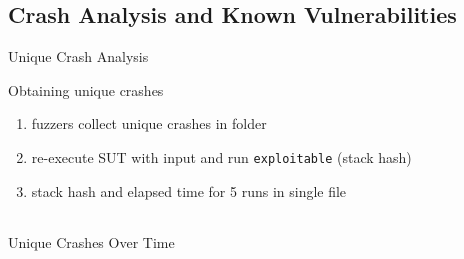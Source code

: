 \documentclass[\HandoutMode,table]{beamer}
\newcommand\figwidth\textwidth
\begin{document}
\subsection{Crash Analysis and Known Vulnerabilities}

\begin{frame}{Unique Crash Analysis}
    \begin{block}{Obtaining unique crashes}
        \begin{enumerate}
            \item{} fuzzers collect unique crashes in folder
            \item{} re-execute SUT with input and run \texttt{exploitable} (stack hash)
            \item{} stack hash and elapsed time for 5 runs in single file
        \end{enumerate}
    \end{block}
    \vspace{\baselineskip}
    \begin{table}
        \begin{tabular}{l c c c c}
            
        \end{tabular}
    \end{table}
\end{frame}

\begin{frame}{Unique Crashes Over Time}
    \renewcommand\figwidth{.32\textwidth}
    \setcounter{subfigure}{0}
    \captionsetup[subfigure]{margin=3pt}
    \begin{figure}
    \end{figure}
\end{frame}
\end{document}
